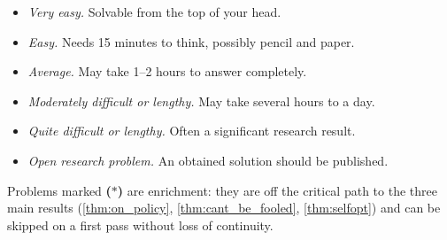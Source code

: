 \documentclass[fontsize=11pt, parskip=half]{scrartcl}
\begin{document}
\begin{itemize}\itemsep=2pt
    \item[\textbf{[00]}] \emph{Very easy.} Solvable from the top of your head.
    \item[\textbf{[10]}] \emph{Easy.} Needs 15 minutes to think, possibly pencil and paper.
    \item[\textbf{[20]}] \emph{Average.} May take 1--2 hours to answer completely.
    \item[\textbf{[30]}] \emph{Moderately difficult or lengthy.} May take several hours to a day.
    \item[\textbf{[40]}] \emph{Quite difficult or lengthy.} Often a significant research result.
    \item[\textbf{[50]}] \emph{Open research problem.} An obtained solution should be published.
\end{itemize}

Problems marked \textbf{($\ast$)} are enrichment: they are off the critical path to the three main results (\cref{thm:on_policy}, \cref{thm:cant_be_fooled}, \cref{thm:selfopt}) and can be skipped on a first pass without loss of continuity.


\clearpage


\end{document}
